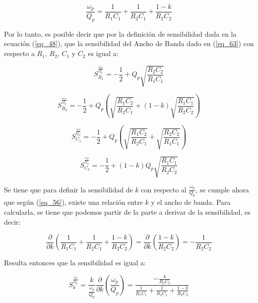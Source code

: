 \documentclass[12pt,a4paper]{article}
\begin{document}
\begin{equation}
    \label{eq_56}
    \frac{\omega_{p}}{Q_{p}} = \frac{1}{R_{1}C_{1}} + \frac{1}{R_{2}C_{1}} + \frac{1-k}{R_{2}C_{2}}
\end{equation}

Por lo tanto, es posible decir que por la definición de sensibilidad dada en la ecuación (\ref{eq_48}), que la sensibilidad del Ancho de Banda dado en (\ref{eq_63}) con respecto a $R_{1}$, $R_{2}$, $ C_{1}$ y $C_{2}$ es igual a:

\begin{equation}
    \label{eq_57}
    S_{R_{1}}^{\frac{\omega_{P}}{Q_{p}}} = -\frac{1}{2} + Q_{p}\sqrt{\frac{R_{2}C_{2}}{R_{1}C_{1}}}
\end{equation}

\begin{equation}
    \label{eq_58}
    S_{R_{2}}^{\frac{\omega_{P}}{Q_{p}}} = -\frac{1}{2} + Q_{p}\left( \sqrt{\frac{R_{1}C_{2}}{R_{2}C_{1}}} + (1-k) \sqrt{\frac{R_{1}C_{1}}{R_{2}C_{2}}}\right)
\end{equation}

\begin{equation}
    \label{eq_59}
    S_{C_{1}}^{\frac{\omega_{P}}{Q_{p}}} = -\frac{1}{2} + Q_{p}\left( \sqrt{\frac{R_{1}C_{2}}{R_{2}C_{1}}} + \sqrt{\frac{R_{2}C_{2}}{R_{1}C_{1}}}\right)
\end{equation}

\begin{equation}
    \label{eq_60}
    S_{C_{2}}^{\frac{\omega_{P}}{Q_{p}}} = -\frac{1}{2} + (1-k)Q_{p} \sqrt{\frac{R_{1}C_{1}}{R_{2}C_{2}}}
\end{equation}

Se tiene que para definir la sensibilidad de $k$ con respecto al $\frac{\omega_{p}}{Q_{p}}$, se cumple ahora que según (\ref{eq_56}), existe una relación entre $k$ y el ancho de banda. Para calcularla, se tiene que podemos partir de la parte a derivar de la sensibilidad, es decir:

\begin{equation}
    \label{eq_61}
    \frac{\partial}{\partial k} \left(\frac{1}{R_{1}C_{1}} + \frac{1}{R_{2}C_{1}} + \frac{1-k}{R_{2}C_{2}}\right) = \frac{\partial}{\partial k} \left(\frac{1-k}{R_{2}C_{2}}\right) = -\frac{1}{R_{2}C_{2}}
\end{equation}

Resulta entonces que la sensibilidad es igual a:

\begin{equation}
    \label{eq_62}
    S_{k}^{\frac{\omega_{p}}{Q_{p}}} = \frac{k}{\frac{\omega_{p}}{Q_{p}}} \frac{\partial}{\partial k} \left(\frac{\omega_{p}}{Q_{p}}\right) = \frac{-\frac{k}{R_{2}C_{2}}}{\frac{1}{R_{1}C_{1}} + \frac{1}{R_{2}C_{1}} + \frac{1-k}{R_{2}C_{2}}}
\end{equation}
\end{document}
